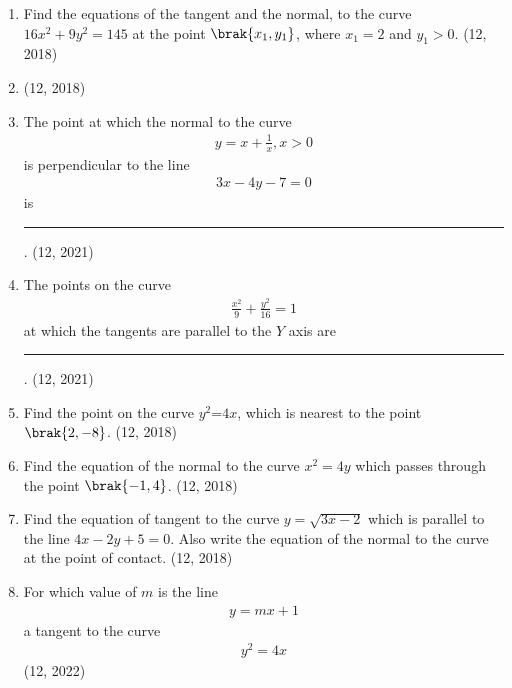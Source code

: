 \begin{enumerate}[label=\thesubsection.\arabic*,ref=\thesubsection.\theenumi]
\item Find the equations of the tangent and the normal, to the curve $16x^{2}+9y^{2}=145$ at the point $\brak{x_1,y_1}$, where $x_1=2$ and $y_1>0$. \hfill (12, 2018)
\item 
\hfill (12, 2018)
\item The point at which the normal to the curve 
\begin{align*}
    y = x+\frac{1}{x}, x>0 
\end{align*}
 is perpendicular to the line
 \begin{align*}
     3x-4y-7 = 0 
 \end{align*}
 is
\rule{1cm}{0.1pt}.
\hfill (12, 2021)
         \item The points on the curve
         \begin{align*}
             \frac{x^2}{9} +\frac{y^2}{16} = 1
         \end{align*}
         at which the tangents are parallel to the $Y$ axis are
\rule{1cm}{0.1pt}.
\hfill (12, 2021)
\item Find the point on the curve $y^2$=$4x$, which is nearest to the point $\brak{2,-8}$.  
\hfill (12, 2018)
\item Find the equation of the normal to the curve ${x}^2 = 4y$ which passes through the point $\brak{-1, 4}$.
\hfill (12, 2018)
\item Find the equation of tangent to the curve $y=\sqrt{3x-2}$ which is parallel to the line $4x-2y+5=0$. Also write the equation of the normal to the curve at the point of contact.
\hfill (12, 2018)
         \item For which value of $m$ is the line
         \begin{align*}
            y = mx + 1 
         \end{align*}a tangent to the curve 
        \begin{align*}
            y^2 = 4x 
        \end{align*}
\hfill (12, 2022)
\end{enumerate} 
